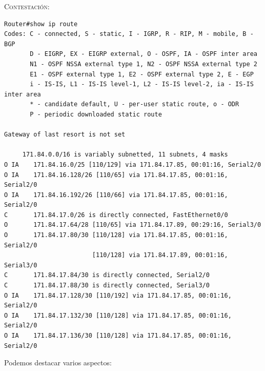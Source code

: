 \documentclass[11pt]{article}
\begin{document}
\begin{enumerate}
\vspace{7px}

\textsc{Contestación}: 

\begin{mdframed}
\begin{verbatim}
Router#show ip route 
Codes: C - connected, S - static, I - IGRP, R - RIP, M - mobile, B - BGP
       D - EIGRP, EX - EIGRP external, O - OSPF, IA - OSPF inter area
       N1 - OSPF NSSA external type 1, N2 - OSPF NSSA external type 2
       E1 - OSPF external type 1, E2 - OSPF external type 2, E - EGP
       i - IS-IS, L1 - IS-IS level-1, L2 - IS-IS level-2, ia - IS-IS inter area
       * - candidate default, U - per-user static route, o - ODR
       P - periodic downloaded static route

Gateway of last resort is not set

     171.84.0.0/16 is variably subnetted, 11 subnets, 4 masks
O IA    171.84.16.0/25 [110/129] via 171.84.17.85, 00:01:16, Serial2/0
O IA    171.84.16.128/26 [110/65] via 171.84.17.85, 00:01:16, Serial2/0
O IA    171.84.16.192/26 [110/66] via 171.84.17.85, 00:01:16, Serial2/0
C       171.84.17.0/26 is directly connected, FastEthernet0/0
O       171.84.17.64/28 [110/65] via 171.84.17.89, 00:29:16, Serial3/0
O       171.84.17.80/30 [110/128] via 171.84.17.85, 00:01:16, Serial2/0
                        [110/128] via 171.84.17.89, 00:01:16, Serial3/0
C       171.84.17.84/30 is directly connected, Serial2/0
C       171.84.17.88/30 is directly connected, Serial3/0
O IA    171.84.17.128/30 [110/192] via 171.84.17.85, 00:01:16, Serial2/0
O IA    171.84.17.132/30 [110/128] via 171.84.17.85, 00:01:16, Serial2/0
O IA    171.84.17.136/30 [110/128] via 171.84.17.85, 00:01:16, Serial2/0
\end{verbatim}
\end{mdframed}

Podemos destacar varios aspectos: 


\end{enumerate}
\end{document}
